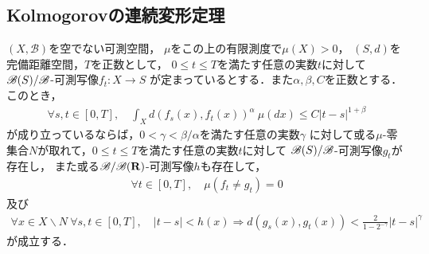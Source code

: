 \subsection{Kolmogorovの連続変形定理}
	\begin{screen}
		\begin{thm}[Kolmogorovの連続変形定理]
			$(X,\mathscr{B})$を空でない可測空間，
			$\mu$をこの上の有限測度で$\mu(X) > 0$，
			$(S,d)$を完備距離空間，$T$を正数として，
			$0 \leq t \leq T$を満たす任意の実数$t$に対して
			$\mathscr{B}(S)/\mathscr{B}$-可測写像$f_t:X \longrightarrow S$
			が定まっているとする．また$\alpha,\beta,C$を正数とする．このとき，
			\begin{align}
				\forall s,t \in [0,T],\quad
				\int_X d(f_s(x),f_t(x))^\alpha\ \mu(dx)
				\leq C |t-s|^{1+\beta}
			\end{align}
			が成り立っているならば，$0 < \gamma < \beta/\alpha$を満たす任意の実数$\gamma$
			に対して或る$\mu$-零集合$N$が取れて，$0 \leq t \leq T$を満たす任意の実数$t$に対して
			$\mathscr{B}(S)/\mathscr{B}$-可測写像$g_t$が存在し，
			また或る$\mathscr{B}/\mathscr{B}(\mathbf{R})$-可測写像$h$も存在して，
			\begin{align}
				\forall t \in [0,T],\quad \mu(f_t \neq g_t) = 0
			\end{align}
			及び
			\begin{align}
				\forall x \in X \backslash N\ \forall s,t \in [0,T],\quad
				|t-s| < h(x) \Longrightarrow
				d(g_s(x),g_t(x)) < \frac{2}{1-2^{-\gamma}}|t-s|^\gamma
			\end{align}
			が成立する．
		\end{thm}
	\end{screen}